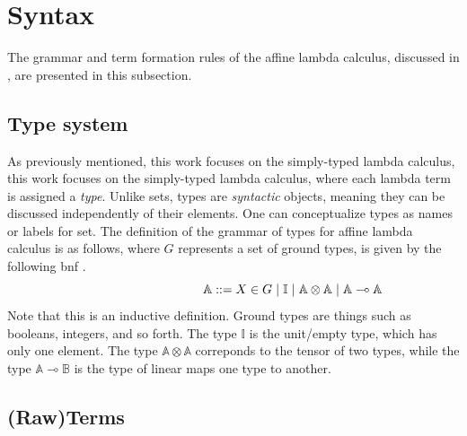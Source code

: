 \section{Syntax}

The grammar and term formation rules of the affine lambda calculus, discussed in \cite{dahlqvist2022syntactic}, are presented in this subsection.

\subsection{Type system}

As previously mentioned, this work focuses on the simply-typed lambda calculus, this work focuses on the simply-typed lambda calculus, where each lambda term is assigned a \emph{type}. Unlike sets, types are \emph{syntactic} objects, meaning they can be discussed independently of their elements. One can conceptualize types as names or labels for set. The definition of the grammar of types for affine lambda calculus is as follows, where $G$ represents a set of ground types, is given by the following \acrfull{bnf} \cite{backus1960report}.
\begin{equation} \label{eq:grammartypes}
\centering
\hspace{95pt} \mathbb{A} ::= X \in G \hspace{3 pt} \vert \hspace{3 pt} \mathbb{I}  \hspace{3 pt}  \vert \hspace{3 pt} \mathbb{A}  \otimes  \mathbb{A} \hspace{3 pt} \vert  \hspace{3 pt}  \mathbb{A} \multimap  \mathbb{A}
\end{equation}
Note that this is an inductive definition. Ground types are things such as booleans, integers, and so forth. The type $\mathbb{I}$ is the unit/empty type, which has only one element. The type $\mathbb{A} \otimes \mathbb{A}$ correponds to the tensor of two types, while the type $\mathbb{A} \multimap \mathbb{B}$ is the type of linear maps one type to another.

\subsection{(Raw)Terms}


